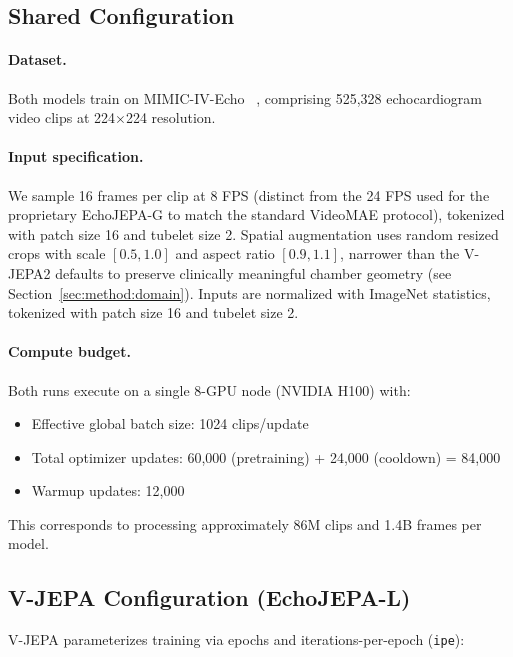 \documentclass{article}
\theoremstyle{plain}
\theoremstyle{definition}
\theoremstyle{remark}
\begin{document}
\subsection{Shared Configuration}

\paragraph{Dataset.} Both models train on MIMIC-IV-Echo~ \citep{PhysioNet-mimic-iv-echo-0.1}, comprising 525,328 echocardiogram video clips at 224$\times$224 resolution.

\paragraph{Input specification.} We sample 16 frames per clip at 8 FPS (distinct from the 24 FPS used for the proprietary EchoJEPA-G to match the standard VideoMAE protocol), tokenized with patch size 16 and tubelet size 2. Spatial augmentation uses random resized crops with scale $[0.5, 1.0]$ and aspect ratio $[0.9, 1.1]$, narrower than the V-JEPA2 defaults to preserve clinically meaningful chamber geometry (see Section~\ref{sec:method:domain}). Inputs are normalized with ImageNet statistics, tokenized with patch size 16 and tubelet size 2.

\paragraph{Compute budget.} Both runs execute on a single 8-GPU node (NVIDIA H100) with:
\begin{itemize}[nosep,leftmargin=1.5em]
    \item Effective global batch size: 1024 clips/update
    \item Total optimizer updates: 60,000 (pretraining) + 24,000 (cooldown) = 84,000
    \item Warmup updates: 12,000
\end{itemize}
This corresponds to processing approximately 86M clips and 1.4B frames per model.

\clearpage

\subsection{V-JEPA Configuration (EchoJEPA-L)}

V-JEPA parameterizes training via epochs and iterations-per-epoch (\texttt{ipe}):
\end{document}

